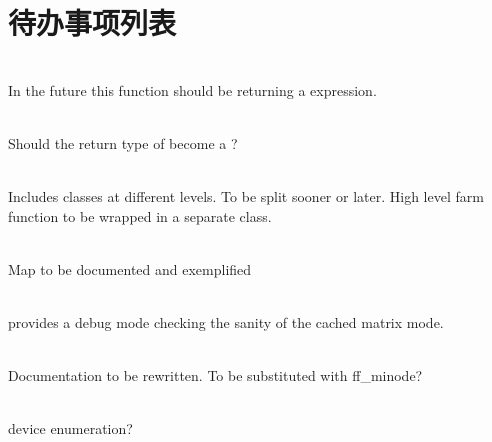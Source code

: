 \chapter{待办事项列表}
\hypertarget{todo}{}\label{todo}

\begin{DoxyRefList}
\item[成员 \doxylink{class_eigen_1_1_transform_a41e2e58b09790eb8e3e220acceb7de1f}{Eigen\+::Transform\texorpdfstring{$<$}{<} \+\_\+\+Scalar, \+\_\+\+Dim, \+\_\+\+Mode, \+\_\+\+Options \texorpdfstring{$>$}{>}\+::Identity} ()]\hfill \\
\label{todo__todo000002}%
%
In the future this function should be returning a  expression.  
\item[成员 \doxylink{group___geometry___module_ga033d6550c1fc82e232f2b4c380c19a54}{Eigen\+::umeyama} (const \doxylink{class_eigen_1_1_matrix_base}{Matrix\+Base$<$ Derived $>$} \&src, const \doxylink{class_eigen_1_1_matrix_base}{Matrix\+Base$<$ Other\+Derived $>$} \&dst, bool with\+\_\+scaling=true)]\hfill \\
\label{todo__todo000003}%
%
Should the return type of  become a ? 
\item[文件 \doxylink{farm_8hpp}{farm.hpp} ]\hfill \\
\label{todo__todo000004}%
%
Includes classes at different levels. To be split sooner or later. High level farm function to be wrapped in a separate class.  
\item[类 \doxylink{classff_1_1ff___map}{ff\+::ff\+\_\+\+Map\texorpdfstring{$<$}{<} IN\+\_\+t, OUT\+\_\+t, reduceT \texorpdfstring{$>$}{>}} ]\hfill \\
\label{todo__todo000006}%
%
Map to be documented and exemplified  
\item[成员 \doxylink{class_gpu_helper_a52a9ab12d07acbf4ad80737595a9b06e}{Gpu\+Helper\+::force\+Matrix\+Target} (\doxylink{gl_8h_a7efd7809e1632cdae75603fd1fee61c0}{GLenum} matrix\+Target)]\hfill \\
\label{todo__todo000001}%
%
provides a debug mode checking the sanity of the cached matrix mode.  
\item[文件 \doxylink{gt_8hpp}{gt.hpp} ]\hfill \\
\label{todo__todo000005}%
%
Documentation to be rewritten. To be substituted with ff\+\_\+minode?  
\item[文件 \doxylink{tpc__api_8h}{tpc\+\_\+api.h} ]\hfill \\
\label{todo__todo000007}%
%
device enumeration? 
\end{DoxyRefList}
